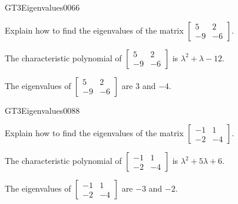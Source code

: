 \newpage




\begin{exercise}{GT3}{Eigenvalues}{0066} 
\begin{exerciseStatement} 

Explain how to find the eigenvalues of the matrix \(\left[\begin{array}{cc}
5 & 2 \\
-9 & -6
\end{array}\right]\).

 \end{exerciseStatement}
 \begin{exerciseAnswer} 

The characteristic polynomial of \(\left[\begin{array}{cc}
5 & 2 \\
-9 & -6
\end{array}\right]\) is \(\lambda^{2} + \lambda - 12\).

 

The eigenvalues of \(\left[\begin{array}{cc}
5 & 2 \\
-9 & -6
\end{array}\right]\) are \(3\) and \(-4\).

 \end{exerciseAnswer}
 \end{exercise}



\begin{exercise}{GT3}{Eigenvalues}{0088} 
\begin{exerciseStatement} 

Explain how to find the eigenvalues of the matrix \(\left[\begin{array}{cc}
-1 & 1 \\
-2 & -4
\end{array}\right]\).

 \end{exerciseStatement}
 \begin{exerciseAnswer} 

The characteristic polynomial of \(\left[\begin{array}{cc}
-1 & 1 \\
-2 & -4
\end{array}\right]\) is \(\lambda^{2} + 5 \lambda + 6\).

 

The eigenvalues of \(\left[\begin{array}{cc}
-1 & 1 \\
-2 & -4
\end{array}\right]\) are \(-3\) and \(-2\).

 \end{exerciseAnswer}
 \end{exercise}


